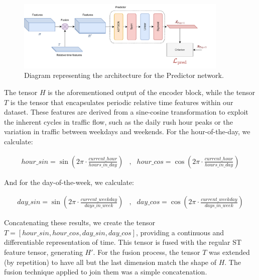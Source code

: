 \begin{figure}[!ht]
\noindent\hspace{0.5mm}\includegraphics[width=0.9\textwidth]{./figures/Predictor.pdf}
\caption{Diagram representing the architecture for the Predictor network.}
\label{fig:Predictor}
\end{figure}

The tensor $H$ is the aforementioned output of the encoder block, while the tensor $T$ is the tensor that encapsulates periodic relative time features within our dataset. These features are derived from a sine-cosine transformation to exploit the inherent cycles in traffic flow, such as the daily rush hour peaks or the variation in traffic between weekdays and weekends. For the hour-of-the-day, we calculate:

\begin{equation}
\begin{aligned}
	hour\_sin=\sin\left(2\pi \cdot\frac{current\_hour}{hours\_in\_day} \right) & , & hour\_cos=\cos\left(2\pi \cdot\frac{current\_hour}{hours\_in\_day} \right)
\end{aligned}
\end{equation}

And for the day-of-the-week, we calculate:

\begin{equation}
\begin{aligned}
	day\_sin=\sin\left(2\pi \cdot\frac{current\_weekday}{days\_in\_week} \right) & , & day\_cos=\cos\left(2\pi \cdot\frac{current\_weekday}{days\_in\_week} \right)
\end{aligned}
\end{equation}

Concatenating these results, we create the tensor $T=[hour\_sin, hour\_cos, day\_sin, day\_cos]$, providing a continuous and differentiable representation of time. This tensor is fused with the regular \gls{ST} feature tensor, generating $H'$. For the fusion process, the tensor $T$ was extended (by repetition) to have all but the last dimension match the shape of $H$. The fusion technique applied to join them was a simple concatenation.

